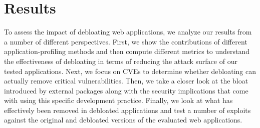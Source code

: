 \section{Results}
\label{section:results}

To assess the impact of debloating web applications, we analyze our results
from a number of different perspectives. First, we show the contributions of different application-profiling methods and then compute different metrics
to understand the effectiveness of debloating in terms of reducing the attack surface of our tested applications. Next, we focus on CVEs to determine whether
debloating can actually remove critical vulnerabilities. Then, we take
a closer look at the bloat introduced by external packages along with the
security implications that come with using this specific development practice.
Finally, we look at what has effectively been removed in debloated applications and test a number of exploits against the original and debloated versions of the evaluated web applications.


